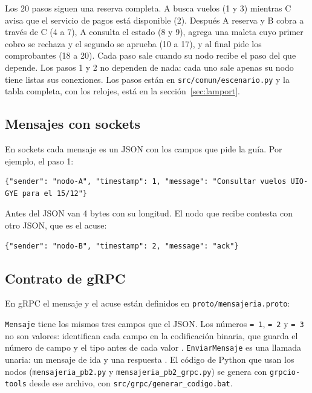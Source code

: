 \documentclass[11pt,a4paper]{article}
\begin{document}
Los 20 pasos siguen una reserva completa. A busca vuelos (1 y 3) mientras C avisa que el servicio de pagos está disponible (2). Después A reserva y B cobra a través de C (4 a 7), A consulta el estado (8 y 9), agrega una maleta cuyo primer cobro se rechaza y el segundo se aprueba (10 a 17), y al final pide los comprobantes (18 a 20). Cada paso sale cuando su nodo recibe el paso del que depende. Los pasos 1 y 2 no dependen de nada: cada uno sale apenas su nodo tiene listas sus conexiones. Los pasos están en \texttt{src/comun/escenario.py} y la tabla completa, con los relojes, está en la sección~\ref{sec:lamport}.

\subsection{Mensajes con sockets}

En sockets cada mensaje es un JSON con los campos que pide la guía. Por ejemplo, el paso 1:

\begin{lstlisting}
{"sender": "nodo-A", "timestamp": 1, "message": "Consultar vuelos UIO-GYE para el 15/12"}
\end{lstlisting}

Antes del JSON van 4 bytes con su longitud. El nodo que recibe contesta con otro JSON, que es el acuse:

\begin{lstlisting}
{"sender": "nodo-B", "timestamp": 2, "message": "ack"}
\end{lstlisting}

\subsection{Contrato de gRPC}

En gRPC el mensaje y el acuse están definidos en \texttt{proto/mensajeria.proto}:



\texttt{Mensaje} tiene los mismos tres campos que el JSON. Los números \texttt{= 1}, \texttt{= 2} y \texttt{= 3} no son valores: identifican cada campo en la codificación binaria, que guarda el número de campo y el tipo antes de cada valor \cite{protobuf_codificacion}. \texttt{EnviarMensaje} es una llamada unaria: un mensaje de ida y una respuesta \cite{grpc_conceptos}. El código de Python que usan los nodos (\texttt{mensajeria\_pb2.py} y \texttt{mensajeria\_pb2\_grpc.py}) se genera con \texttt{grpcio-tools} desde ese archivo, con \texttt{src/grpc/generar\_codigo.bat}.
\end{document}
